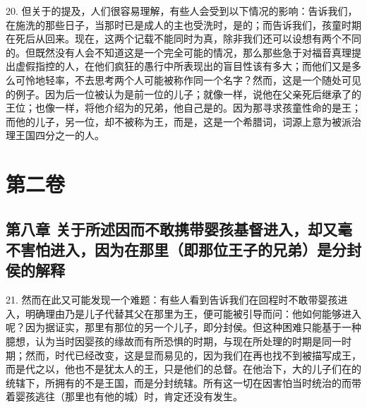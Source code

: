 20. 但关于的提及，人们很容易理解，有些人会受到以下情况的影响：告诉我们，在施洗的那些日子，当那时已是成人的主也受洗时，是的；而告诉我们，孩童时期在死后从回来。现在，这两个记载不能同时为真，除非我们还可以设想有两个不同的。但既然没有人会不知道这是一个完全可能的情况，那么那些急于对福音真理提出虚假指控的人，在他们疯狂的愚行中所表现出的盲目性该有多大；而他们又是多么可怜地轻率，不去思考两个人可能被称作同一个名字？然而，这是一个随处可见的例子。因为后一位被认为是前一位的儿子；就像一样，说他在父亲死后继承了的王位；也像一样，将他介绍为的兄弟，他自己是的。因为那寻求孩童性命的是王；而他的儿子，另一位，却不被称为王，而是，这是一个希腊词，词源上意为被派治理王国四分之一的人。\par



\section{ 第二卷}


\subsection{第八章 关于所述因而不敢携带婴孩基督进入，却又毫不害怕进入，因为在那里（即那位王子的兄弟）是分封侯的解释}

21. 然而在此又可能发现一个难题：有些人看到告诉我们在回程时不敢带婴孩进入，明确理由乃是儿子代替其父在那里为王，便可能被引导而问：他如何能够进入呢？因为据证实，那里有那位的另一个儿子，即分封侯。但这种困难只能基于一种臆想，认为当时因婴孩的缘故而有所恐惧的时期，与现在所处理的时期是同一时期；然而，时代已经改变，这是显而易见的，因为我们在再也找不到被描写成王，而是代之以，他也不是犹太人的王，只是他们的总督。在他治下，大的儿子们在的统辖下，所拥有的不是王国，而是分封统辖。所有这一切在因害怕当时统治的而带着婴孩逃往（那里也有他的城）时，肯定还没有发生。\par

